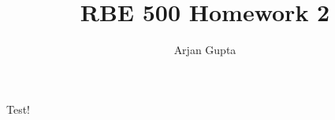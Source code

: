 \documentclass{article}
\title{RBE 500 Homework 2}
\author{Arjan Gupta}
\begin{document}
    \maketitle
    Test!
\end{document}

